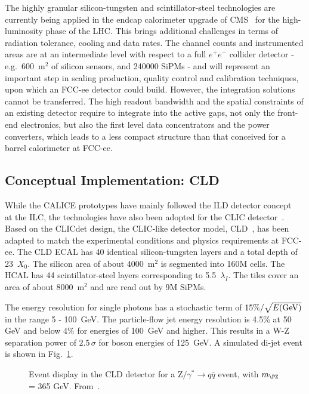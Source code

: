 The highly granular silicon-tungsten and scintillator-steel technologies are currently being applied in the endcap calorimeter upgrade of CMS~\cite{collaboration:2017gbu} for the high-luminosity phase of the LHC. 
This brings additional challenges in terms of radiation tolerance, cooling and data rates.
The channel counts and instrumented areas are at an intermediate level with respect to a full $e^+e^-$ collider detector - e.g.\ 600~m$^2$ of silicon sensors, and 240000 SiPMs - and will represent an important step in scaling production, quality control and calibration techniques, upon which an FCC-ee detector could build. 
However, the integration solutions cannot be transferred. 
The high readout bandwidth and the spatial constraints of an existing detector require to integrate into the active gaps, not only the front-end electronics, but also the first level data concentrators and the power converters, which leads to a less compact structure than that conceived for a barrel calorimeter at FCC-ee. 

\subsection{Conceptual Implementation: CLD}
While the CALICE prototypes have mainly followed the ILD detector concept~\cite{ILD:2020qve} at the ILC, the technologies have also been  adopted for the CLIC detector~\cite{AlipourTehrani:2017gov}. 
Based on the CLICdet design, the CLIC-like detector model, CLD~\cite{Bacchetta:2019fmz}, has been adapted to match the experimental conditions and physics requirements at FCC-ee.
The CLD ECAL has 40 identical silicon-tungsten layers and a total depth of 23~$X_0$. 
The silicon area of about 4000~m$^2$ is segmented into 160M cells.
The HCAL has 44 scintillator-steel layers corresponding to 5.5~$\lambda_I$.
The tiles cover an area of about 8000~m$^2$ and are read out by 9M SiPMs. 

The energy resolution for single photons has a stochastic term of $15\%/\sqrt{E({\rm GeV})}$ in the range 5 - 100~GeV. The particle-flow jet energy resolution is 4.5\% at 50 GeV and below 4\% for energies of 100~GeV and higher. 
This results in a W-Z separation power of $2.5\,\sigma$ for boson energies of 125~GeV.
A simulated di-jet event is shown in Fig.~\ref{fig:CLDjets}. 
\begin{figure}
    \centering
    \caption{Event display in the CLD detector for a 
    $\mathrm{Z}/\gamma^*\rightarrow q\bar{q}$
    event, with $m_{\PZ}$ = 365 GeV.
    From~\cite{Bacchetta:2019fmz}.
    }
    \label{fig:CLDjets}
\end{figure}

